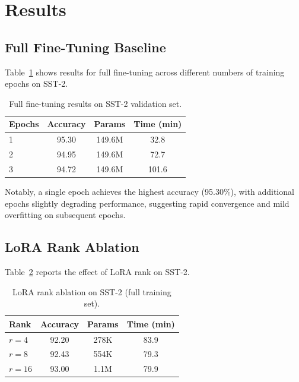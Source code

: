 \documentclass[11pt]{article}
\begin{document}
\section{Results}

\subsection{Full Fine-Tuning Baseline}

Table~\ref{tab:baseline} shows results for full fine-tuning across
different numbers of training epochs on SST-2.

\begin{table}[h]
\centering
\small
\begin{tabular}{lccc}
\toprule
\textbf{Epochs} & \textbf{Accuracy} & \textbf{Params} & \textbf{Time (min)} \\
\midrule
1 & 95.30 & 149.6M & 32.8 \\
2 & 94.95 & 149.6M & 72.7 \\
3 & 94.72 & 149.6M & 101.6 \\
\bottomrule
\end{tabular}
\caption{Full fine-tuning results on SST-2 validation set.}
\label{tab:baseline}
\end{table}

Notably, a single epoch achieves the highest accuracy (95.30\%), with
additional epochs slightly degrading performance, suggesting rapid
convergence and mild overfitting on subsequent epochs.

\subsection{LoRA Rank Ablation}

Table~\ref{tab:lora_rank} reports the effect of LoRA rank on SST-2.

\begin{table}[h]
\centering
\small
\begin{tabular}{lccc}
\toprule
\textbf{Rank} & \textbf{Accuracy} & \textbf{Params} & \textbf{Time (min)} \\
\midrule
$r=4$  & 92.20 & 278K  & 83.9 \\
$r=8$  & 92.43 & 554K  & 79.3 \\
$r=16$ & 93.00 & 1.1M  & 79.9 \\
\bottomrule
\end{tabular}
\caption{LoRA rank ablation on SST-2 (full training set).}
\label{tab:lora_rank}
\end{table}
\end{document}
